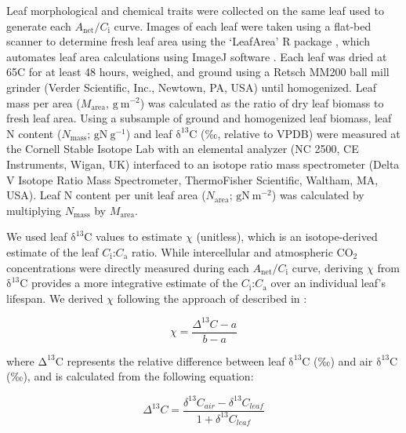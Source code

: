 Leaf morphological and chemical traits were collected on the same leaf used to generate each $A_\mathrm{{net}}/C_\mathrm{i}$ curve. Images of each leaf were taken using a flat-bed scanner to determine fresh leaf area using the ‘LeafArea’ R package , which automates leaf area calculations using ImageJ software . Each leaf was dried at 65\textdegree{}C for at least 48 hours, weighed, and ground using a Retsch MM200 ball mill grinder (Verder Scientific, Inc., Newtown, PA, USA) until homogenized. Leaf mass per area ($M\mathrm{_{area}}$, $\mathrm{g\ m^{-2}}$) was calculated as the ratio of dry leaf biomass to fresh leaf area. Using a subsample of ground and homogenized leaf biomass, leaf N content ($N\mathrm{_{mass}}$; $\mathrm{gN\ g^{-1}}$) and leaf $\mathrm{\delta^{13}C}$ (‰, relative to VPDB) were measured at the Cornell Stable Isotope Lab with an elemental analyzer (NC 2500, CE Instruments, Wigan, UK) interfaced to an isotope ratio mass spectrometer (Delta V Isotope Ratio Mass Spectrometer, ThermoFisher Scientific, Waltham, MA, USA). Leaf N content per unit leaf area ($N\mathrm{_{area}}$; $\mathrm{gN\ m^{-2}}$) was calculated by multiplying $N\mathrm{_{mass}}$ by $M\mathrm{_{area}}$.

We used leaf $\mathrm{\delta^{13}C}$ values to estimate $\chi$ (unitless), which is an isotope-derived estimate of the leaf $C_\mathrm{i}$:$C_\mathrm{a}$ ratio. While intercellular and atmospheric $\mathrm{CO_2}$ concentrations were directly measured during each $A_\mathrm{{net}}/C_\mathrm{i}$ curve, deriving $\chi$ from $\mathrm{\delta^{13}C}$ provides a more integrative estimate of the $C_\mathrm{i}$:$C_\mathrm{a}$ over an individual leaf’s lifespan. We derived $\chi$ following the approach of  described in :

\begin{equation} \label{eq_2.1}
    \chi= \frac{\Delta^{13}C-a}{b-a}
\end{equation}

\noindent where $\mathrm{\Delta^{13}C}$ represents the relative difference between leaf $\mathrm{\delta^{13}C}$ (‰) and air $\mathrm{\delta^{13}C}$ (‰), and is calculated from the following equation:

\begin{equation} \label{eq_2.2}
    \Delta^{13}C= \frac{\delta^{13}C_{air}-\delta^{13}C_{leaf}}{1+\delta^{13}C_{leaf}}
\end{equation}
    
